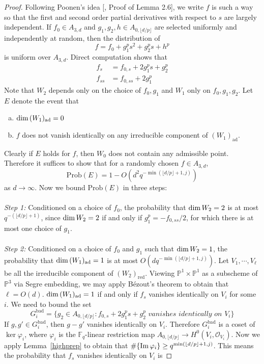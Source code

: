 \documentclass[12pt]{article}
\theoremstyle{plain}
\theoremstyle{definition}
\newcommand{\IF}{\mathbb{F}}
\newcommand{\IP}{\mathbb{P}}
\newcommand{\sO}{\mathcal{O}}
\renewcommand\dim{{\rm dim\,}}
\newcommand{\im}{{\rm Im\,}}
\newcommand{\<}{\langle}
\renewcommand{\>}{\rangle}
\newcommand{\Prob}{\mathrm{Prob}}
\newcommand{\ad}{\mathrm{ad}}
\begin{document}
\begin{proof}
Following Poonen's idea [\cite{Poonen}, Proof of Lemma 2.6], we write $f$ is such a way so that the first and second order partial derivatives with respect to $s$ are largely independent. If $f_0 \in A_{3, d}$ and $g_1, g_2, h \in A_{0, \lfloor d/p \rfloor}$ are selected uniformly and independently at random, then the distribution of 
$$ f = f_0 + g_1^p s^2 + g_2^p s + h^p $$
is uniform over $A_{3, d}$. 
Direct computation shows that 
\begin{align*}
f_s &= f_{0, s} + 2 g_1^p s + g_2^p\\
f_{ss} &= f_{0, ss} + 2 g_1^p 
\end{align*} 
Note that $W_2$ depends only on the choice of $f_0, g_1$ and $W_1$ only on $f_0, g_1, g_2$.  Let $E$ denote the event that 
\begin{enumerate}[a.]
\item $\dim (W_1)_{\ad} = 0$  
\item $f$ does not vanish identically on any irreducible component of $(W_1)_{\ad}$. 
\end{enumerate} 
Clearly if $E$ holds for $f$, then $W_0$ does not contain any admissible point. Therefore it suffices to show that for a randomly chosen $f \in A_{3, d}$, 
$$ \Prob(E) = 1 - O(d^2 q^{- \min(\lfloor d/p \rfloor + 1, j)})  $$
as $d \to \infty$. Now we bound $\Prob(E)$ in three steps: \\\\
\textit{Step 1: }Conditioned on a choice of $f_0$, the probability that $\dim W_2 = 2$ is at most $q^{- (\lfloor d/p \rfloor + 1)}$, since $\dim W_2 = 2$ if and only if $g_1^p = - f_{0, ss}/2$, for which there is at most one choice of $g_1$. \\\\
\textit{Step 2: }Conditioned on a choice of $f_0$ and $g_1$ such that $\dim W_2 = 1$, the probability that $\dim (W_1)_{\mathrm{ad}} = 1$ is at most $O(d q^{- \min(\lfloor d/p \rfloor + 1, j)})$. Let $V_1, \cdots, V_\ell$ be all the irreducible component of $(W_2)_{\mathrm{red}}$. Viewing $\IP^1 \times \IP^1$ as a subscheme of $\IP^3$ via Segre embedding, we may apply B{\'e}zout's theorem to obtain that $\ell = O(d)$. $\dim (W_1)_{\ad} = 1$ if and only if $f_s$ vanishes identically on $V_i$ for some $i$. We need to bound the set
$$ G^{\mathrm{bad}}_i = \{ g_2 \in A_{0, \lfloor d/p \rfloor} : f_{0, s} + 2 g_1^p s + g_2^p \textit{ vanishes identically on }V_i \} $$
If $g, g' \in G^{\mathrm{bad}}_i$, then $g - g'$ vanishes identically on $V_i$. Therefore $G^{\mathrm{bad}}_i$ is a coset of $\ker \varphi_i$, where $\varphi_i$ is the $\IF_q$-linear restriction map $A_{0, \lfloor d/p \rfloor} \to H^0(V_i, \sO_{V_i})$. Now we apply Lemma~\ref{highprep} to obtain that $\# \{ \im \varphi_i \} \ge q^{\min(\lfloor d/p \rfloor + 1, j)}$. This means the probability that $f_s$ vanishes identically on $V_i$ is

\end{proof}
\end{document}
